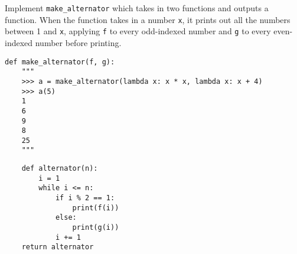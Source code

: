 \begin{blocksection}
\question Implement \lstinline$make_alternator$ which takes in two functions and outputs a function. When the function takes in a number \texttt{x}, it prints out all the numbers between 1 and \texttt{x}, applying \texttt{f} to every odd-indexed number and \texttt{g} to every even-indexed number before printing.

\begin{lstlisting}
def make_alternator(f, g):
    """
    >>> a = make_alternator(lambda x: x * x, lambda x: x + 4)
    >>> a(5)
    1
    6
    9
    8
    25
    """
\end{lstlisting}

\begin{solution}[1.5in]
\begin{lstlisting}
    def alternator(n):
        i = 1
        while i <= n:
            if i % 2 == 1:
                print(f(i))
            else:
                print(g(i))
            i += 1
    return alternator
\end{lstlisting}
\end{solution}
\end{blocksection}
